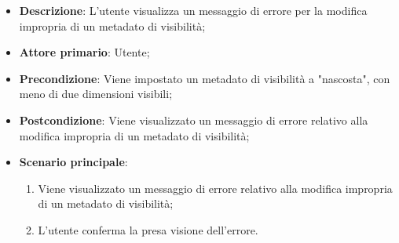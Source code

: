 \begin{itemize}
    \item \textbf{Descrizione}: L'utente visualizza un messaggio di errore per la modifica impropria di un metadato di 
    visibilità;

    \item \textbf{Attore primario}: Utente;
    
    \item \textbf{Precondizione}:   Viene impostato un metadato di visibilità a "nascosta", con meno di due dimensioni 
    visibili;

    \item \textbf{Postcondizione}:   Viene visualizzato un messaggio di errore relativo alla modifica impropria di un 
    metadato di visibilità;

    \item \textbf{Scenario principale}:
    \begin{enumerate}
        \item Viene visualizzato un messaggio di errore relativo alla modifica impropria di un metadato di visibilità;
        \item L'utente conferma la presa visione dell'errore.
    \end{enumerate}
\end{itemize}